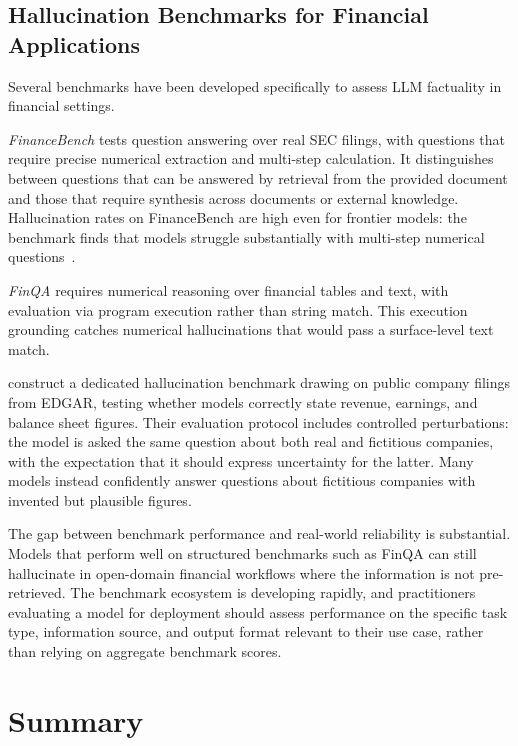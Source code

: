 \subsection{Hallucination Benchmarks for Financial Applications}
\label{sec:ch13-hallucination-benchmarks}

Several benchmarks have been developed specifically to assess LLM factuality in
financial settings.

\emph{FinanceBench} \cite{zhang2024financebench} tests question answering over real
SEC filings, with questions that require precise numerical extraction and multi-step
calculation. It distinguishes between questions that can be answered by retrieval from
the provided document and those that require synthesis across documents or external
knowledge. Hallucination rates on FinanceBench are high even for frontier models: the
benchmark finds that models struggle substantially with multi-step numerical questions~\cite{zhang2024financebench}.

\emph{FinQA} \cite{chen2021finqa} requires numerical reasoning over financial tables
and text, with evaluation via program execution rather than string match. This execution
grounding catches numerical hallucinations that would pass a surface-level text match.

\citet{kang2023hallucination} construct a dedicated hallucination benchmark drawing on
public company filings from EDGAR, testing whether models correctly state revenue,
earnings, and balance sheet figures. Their evaluation protocol includes controlled
perturbations: the model is asked the same question about both real and fictitious
companies, with the expectation that it should express uncertainty for the latter.
Many models instead confidently answer questions about fictitious companies with
invented but plausible figures.

The gap between benchmark performance and real-world reliability is substantial. Models
that perform well on structured benchmarks such as FinQA can still hallucinate in
open-domain financial workflows where the information is not pre-retrieved. The benchmark
ecosystem is developing rapidly, and practitioners evaluating a model for deployment
should assess performance on the specific task type, information source, and output
format relevant to their use case, rather than relying on aggregate benchmark scores.

\section{Summary}
\label{sec:ch13-summary}

